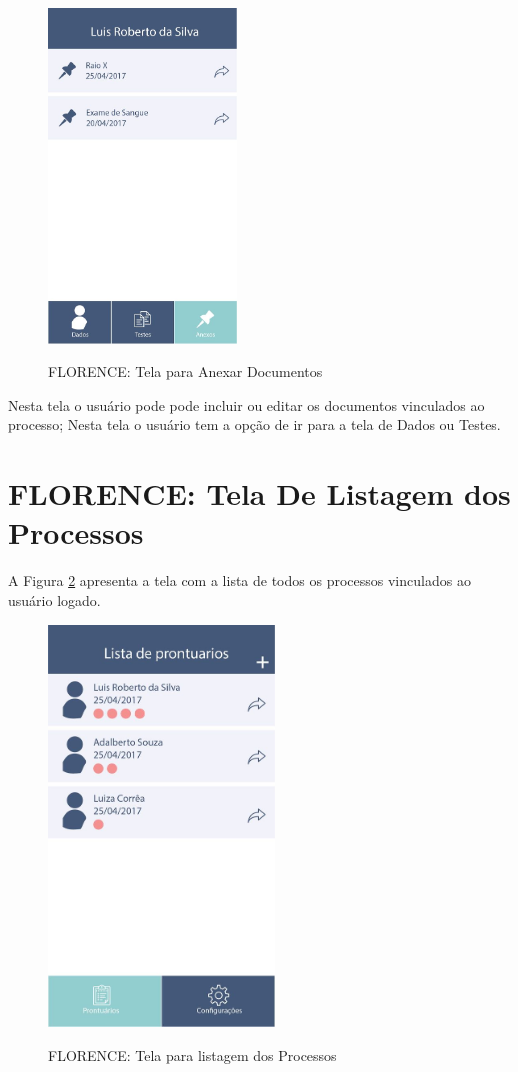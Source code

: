 \documentclass[portuguese,oneside]{tcc}
\begin{document}
\begin{figure}[htp]
\centering
\caption{FLORENCE: Tela para Anexar Documentos}
\includegraphics[width=5cm]{app-attachment}
\label{fig:app-anexo}
\end{figure}

Nesta tela o usuário pode pode incluir ou editar os documentos vinculados ao processo; Nesta tela o usuário tem a opção de ir para a tela de Dados ou Testes.


\section{FLORENCE: Tela De Listagem dos Processos}
A Figura \ref{fig:app-list} apresenta a tela com a lista de todos os processos vinculados ao usuário logado.

\begin{figure}[htp]
\centering
\caption{FLORENCE: Tela para listagem dos Processos}
\includegraphics[width=6cm]{app-list}
\label{fig:app-list}
\end{figure}
\end{document}
